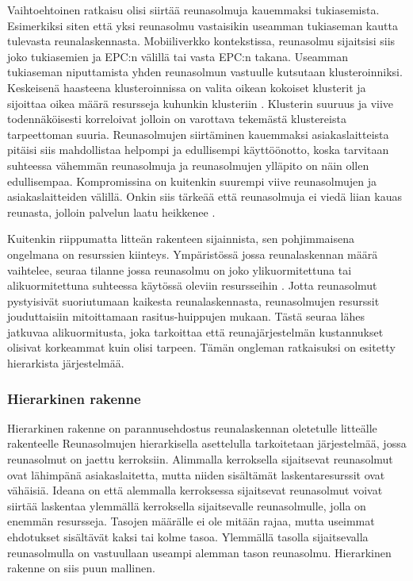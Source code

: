 Vaihtoehtoinen ratkaisu olisi siirtää reunasolmuja kauemmaksi tukiasemista. Esimerkiksi siten että yksi reunasolmu vastaisikin useamman tukiaseman kautta tulevasta reunalaskennasta. Mobiiliverkko kontekstissa, reunasolmu sijaitsisi siis joko tukiasemien ja EPC:n välillä tai vasta EPC:n takana.  
Useamman tukiaseman niputtamista yhden reunasolmun vastuulle kutsutaan klusteroinniksi. 
Keskeisenä haasteena klusteroinnissa on valita oikean kokoiset klusterit ja sijoittaa oikea määrä resursseja kuhunkin klusteriin \cite{malandrino2016close}.
Klusterin suuruus ja viive todennäköisesti korreloivat jolloin on varottava tekemästä klustereista tarpeettoman suuria.
Reunasolmujen siirtäminen kauemmaksi asiakaslaitteista pitäisi siis mahdollistaa helpompi ja edullisempi käyttöönotto, koska tarvitaan suhteessa vähemmän reunasolmuja ja reunasolmujen ylläpito on näin ollen edullisempaa.
Kompromissina on kuitenkin suurempi viive reunasolmujen ja asiakaslaitteiden välillä. 
Onkin siis tärkeää että reunasolmuja ei viedä liian kauas reunasta, jolloin palvelun laatu heikkenee \cite{mao17}. 


Kuitenkin riippumatta litteän rakenteen sijainnista, sen pohjimmaisena ongelmana on resurssien kiinteys. Ympäristössä jossa reunalaskennan määrä vaihtelee, seuraa tilanne jossa reunasolmu on joko ylikuormitettuna tai alikuormitettuna suhteessa käytössä oleviin resursseihin \cite{tong2016hierarchical}. Jotta reunasolmut pystyisivät suoriutumaan kaikesta reunalaskennasta, reunasolmujen resurssit jouduttaisiin mitoittamaan rasitus-huippujen mukaan. Tästä seuraa lähes jatkuvaa alikuormitusta, joka tarkoittaa että reunajärjestelmän kustannukset olisivat korkeammat kuin olisi tarpeen. 
Tämän ongleman ratkaisuksi on esitetty hierarkista järjestelmää.




\subsubsection{Hierarkinen rakenne}
Hierarkinen rakenne on parannusehdostus reunalaskennan oletetulle litteälle rakenteelle \cite{tong2016hierarchial}
Reunasolmujen hierarkisella asettelulla tarkoitetaan järjestelmää, jossa reunasolmut on jaettu kerroksiin. Alimmalla kerroksella sijaitsevat reunasolmut ovat lähimpänä asiakaslaitetta, mutta niiden sisältämät laskentaresurssit ovat vähäisiä. 
Ideana on että alemmalla kerroksessa sijaitsevat reunasolmut voivat siirtää laskentaa ylemmällä kerroksella sijaitsevalle reunasolmulle, jolla on enemmän resursseja. Tasojen määrälle ei ole mitään rajaa, mutta useimmat ehdotukset sisältävät kaksi tai kolme tasoa.
Ylemmällä tasolla sijaitsevalla reunasolmulla on vastuullaan useampi alemman tason reunasolmu. Hierarkinen rakenne on siis puun mallinen.

